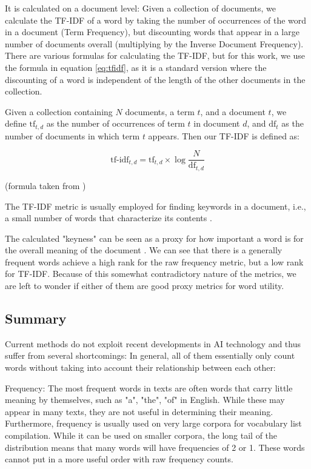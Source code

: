 It is calculated on a document level:
Given a collection of documents, we calculate the TF-IDF of a word by taking the number of occurrences of the word in a document (Term Frequency), but discounting words that appear in a large number of documents overall (multiplying by the Inverse Document Frequency).
There are various formulas for calculating the TF-IDF, but for this work, we use the formula in equation \ref{eq:tfidf}, as it is a standard version where the discounting of a word is independent of the length of the other documents in the collection.

Given a collection containing $N$ documents, a term $t$, and a document $t$, we define $\text{tf}_{t,d}$ as the number of occurrences of term $t$ in document $d$, and $\text{df}_{t}$ as the number of documents in which term $t$ appears. Then our TF-IDF is defined as:

\begin{equation}\label{eq:tfidf}
	\text{tf-idf}_{t,d} = \text{tf}_{t,d} \times \log \frac{N}{\text{df}_{t,d}}
\end{equation}

(formula taken from \cite{qaiserTextMiningUse2018})


The TF-IDF metric is usually employed for finding keywords in a document, i.e., a small number of words that characterize its contents \cite{qaiserTextMiningUse2018}.

The calculated "keyness" can be seen as a proxy for how important a word is for the overall meaning of the document .
We can see that there is a generally frequent words achieve a high rank for the raw frequency metric, but a low rank for TF-IDF.
Because of this somewhat contradictory nature of the metrics, we are left to wonder if either of them are good proxy metrics for word utility.


\subsection{Summary} \label{sec:ranking-vocab-lists-summary}
Current methods do not exploit recent developments in AI technology and thus suffer from several shortcomings:
In general, all of them essentially only count words without taking into account their relationship between each other:

Frequency: The most frequent words in texts are often words that carry little meaning by themselves, such as "a", "the", "of" in English.
While these may appear in many texts, they are not useful in determining their meaning.
Furthermore, frequency is usually used on very large corpora for vocabulary list compilation.
While it can be used on smaller corpora, the long tail of the distribution means that many words will have frequencies of 2 or 1.
These words cannot put in a more useful order with raw frequency counts.

